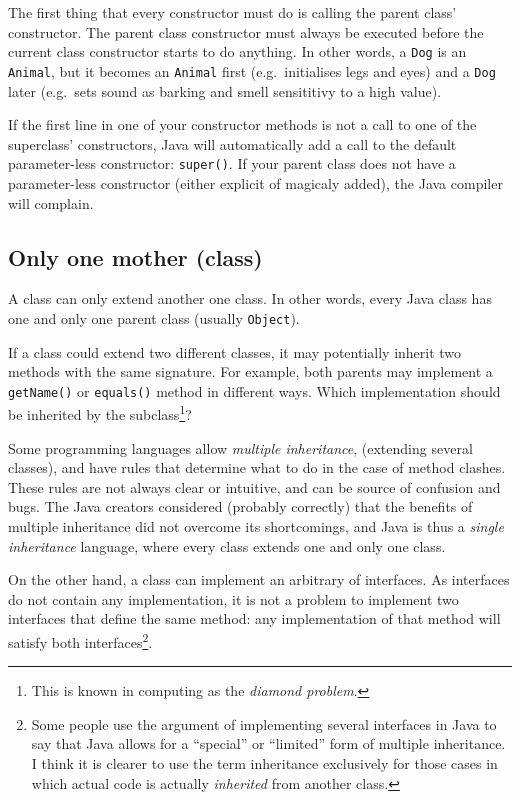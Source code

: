 The first thing that every constructor must do is calling the parent
class' constructor. The parent class constructor must always be
executed before the current class constructor starts to do
anything. In other words, a \verb+Dog+ is an \verb+Animal+, but it
becomes an \verb+Animal+ first (e.g.~initialises legs and eyes) and a
\verb+Dog+ later (e.g.~sets sound as barking and smell sensititivy to
a high value).

If the first line in one of your constructor methods is not a call to
one of the superclass' constructors, Java will automatically add a
call to the default parameter-less constructor: \verb+super()+. If
your parent class does not have a parameter-less constructor (either
explicit of magicaly added), the Java compiler will complain. 

\subsection{Only one mother (class)}
\label{sec:limits-inheritance}

A class can only extend another one class. In other words, every Java
class has one and only one parent class (usually \verb+Object+). 

If a class could extend two different classes, it may potentially
inherit two methods with the same signature. For example, both parents
may implement a \verb+getName()+ or \verb+equals()+ method in
different ways. Which implementation should be inherited by the
subclass\footnote{This is known in computing as the \emph{diamond
    problem}.}?

Some programming languages allow \emph{multiple inheritance},
(extending several classes), and have rules that determine what to do
in the case of method clashes. These rules are not always clear or
intuitive, and can be source of confusion and bugs. The Java creators
considered (probably correctly) that the benefits of multiple
inheritance did not overcome its shortcomings, and Java is thus a
\emph{single inheritance} language, where every class extends one and
only one class. 

On the other hand, a class can implement an arbitrary of
interfaces. As interfaces do not contain any implementation, it is not
a problem to implement two interfaces that define the same method: any
implementation of that method will satisfy both
interfaces\footnote{Some people use the argument of implementing
  several interfaces in Java to say that Java allows for a ``special''
  or ``limited'' form of multiple inheritance. I think it is clearer
  to use the term inheritance exclusively for those cases 
  in which actual code is
  actually \emph{inherited} from another class. }. 

